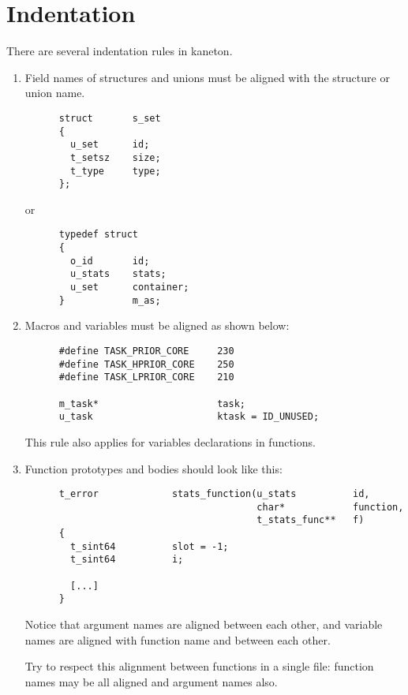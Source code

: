 %
%

\section{Indentation}

There are several indentation rules in kaneton.

\begin{enumerate}
  \item
    Field names of structures and unions must be aligned with the
    structure or union name.

    \begin{verbatim}
      struct       s_set
      {
        u_set      id;
        t_setsz    size;
        t_type     type;
      };
    \end{verbatim}

    or

    \begin{verbatim}
      typedef struct
      {
        o_id       id;
        u_stats    stats;
        u_set      container;
      }            m_as;
    \end{verbatim}
  \item
    Macros and variables must be aligned as shown below:

    \begin{verbatim}
      #define TASK_PRIOR_CORE     230
      #define TASK_HPRIOR_CORE    250
      #define TASK_LPRIOR_CORE    210

      m_task*                     task;
      u_task                      ktask = ID_UNUSED;
    \end{verbatim}

    This rule also applies for variables declarations in functions.
  \item
    Function prototypes and bodies should look like this:

    \begin{verbatim}
      t_error             stats_function(u_stats          id,
                                         char*            function,
                                         t_stats_func**   f)
      {
        t_sint64          slot = -1;
        t_sint64          i;

        [...]
      }
    \end{verbatim}

    Notice that argument names are aligned between each other,
    and variable names are aligned with function name and between
    each other.

    Try to respect this alignment between functions in a single file:
    function names may be all aligned and argument names also.
\end{enumerate}

